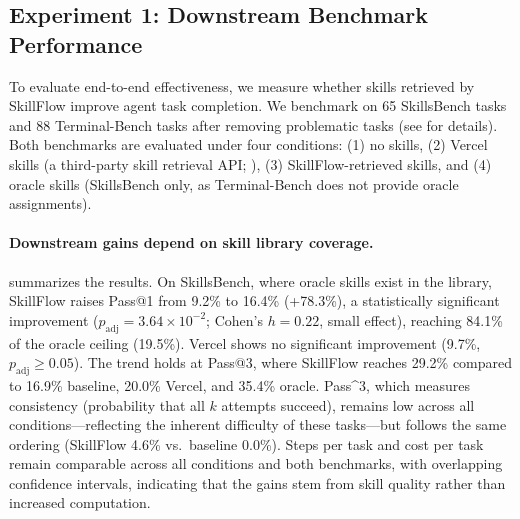 \documentclass[11pt]{article}
\begin{document}
\subsection{Experiment 1: Downstream Benchmark Performance}
\label{sec:experiment_benchmark}

To evaluate end-to-end effectiveness, we measure whether skills retrieved by SkillFlow improve agent task completion.
We benchmark on 65 SkillsBench tasks and 88 Terminal-Bench tasks after removing problematic tasks (see  for details).
Both benchmarks are evaluated under four conditions: (1) no skills, (2) Vercel skills (a third-party skill retrieval API; ), (3) SkillFlow-retrieved skills, and (4) oracle skills (SkillsBench only, as Terminal-Bench does not provide oracle assignments).

\begin{table}[t]
  \centering
  \caption{Benchmark performance comparison.
  Pass@$k$: probability of at least one success in $k$ independent attempts; Pass\textasciicircum$k$: probability that all $k$ attempts succeed.
  Oracle skills are the curated task-skill pairs provided by SkillsBench.
  $^{*}p_{\text{adj}}<0.05$ vs.\ no skills baseline.}
  \label{tab:results}
  
\end{table}

\paragraph{Downstream gains depend on skill library coverage.}
 summarizes the results.
On SkillsBench, where oracle skills exist in the library, SkillFlow raises Pass@1 from 9.2\% to 16.4\% (+78.3\%), a statistically significant improvement ($p_{\text{adj}} = 3.64 \times 10^{-2}$; Cohen's $h = 0.22$, small effect), reaching 84.1\% of the oracle ceiling (19.5\%).
Vercel shows no significant improvement (9.7\%, $p_{\text{adj}} \geq 0.05$).
The trend holds at Pass@3, where SkillFlow reaches 29.2\% compared to 16.9\% baseline, 20.0\% Vercel, and 35.4\% oracle.
Pass\textasciicircum3, which measures consistency (probability that all $k$ attempts succeed), remains low across all conditions---reflecting the inherent difficulty of these tasks---but follows the same ordering (SkillFlow 4.6\% vs.\ baseline 0.0\%).
Steps per task and cost per task remain comparable across all conditions and both benchmarks, with overlapping confidence intervals, indicating that the gains stem from skill quality rather than increased computation.
\end{document}
